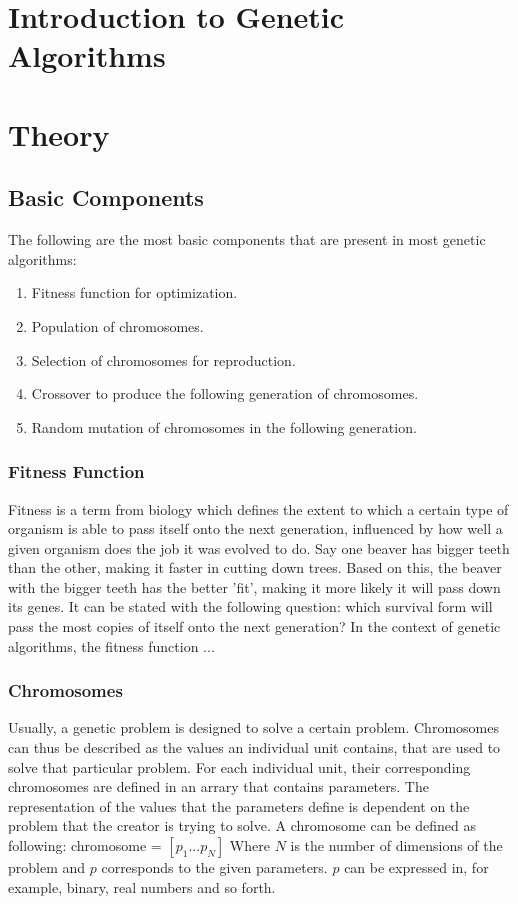 \documentclass{article}
\begin{document}
\section{Introduction to Genetic Algorithms}
\newpage
\section{Theory}

\subsection{Basic Components}
The following are the most basic components that are present in most genetic algorithms:
\begin{enumerate}
    \item Fitness function for optimization.
    \item Population of chromosomes.
    \item Selection of chromosomes for reproduction.
    \item Crossover to produce the following generation of chromosomes.
    \item Random mutation of chromosomes in the following generation.
\end{enumerate}

\bigbreak
\subsubsection{Fitness Function}
Fitness is a term from biology which defines the extent to which a certain type of organism is able to pass itself onto the next generation, influenced by how well a given organism does the job it was evolved to do. Say one beaver has bigger teeth than the other, making it faster in cutting down trees. Based on this, the beaver with the bigger teeth has the better 'fit', making it more likely it will pass down its genes. It can be stated with the following question: which survival form will pass the most copies of itself onto the next generation?\medbreak
In the context of genetic algorithms, the fitness function ...

\bigbreak
\subsubsection{Chromosomes}
Usually, a genetic problem is designed to solve a certain problem. Chromosomes can thus be described as the values an individual unit contains, that are used to solve that particular problem. For each individual unit, their corresponding chromosomes are defined in an arrary that contains parameters. The representation of the values that the parameters define is dependent on the problem that the creator is trying to solve. A chromosome can be defined as following:\smallbreak
chromosome = $\left[ p_{1} ... p_{N} \right]$\smallbreak
Where $N$ is the number of dimensions of the problem and $p$ corresponds to the given parameters. $p$ can be expressed in, for example, binary, real numbers and so forth.
\end{document}
